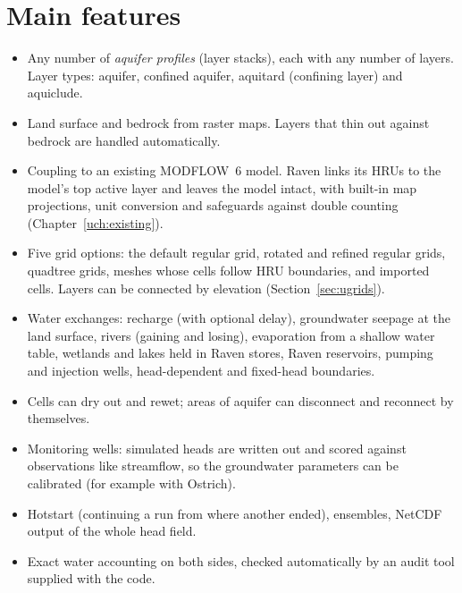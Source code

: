 \section{Main features}
\begin{itemize}
\item Any number of \emph{aquifer profiles} (layer stacks), each with any number of layers. Layer types: aquifer,
confined aquifer, aquitard (confining layer) and aquiclude.
\item Land surface and bedrock from raster maps. Layers that thin out against bedrock are handled automatically.
\item Coupling to an existing MODFLOW~6 model. Raven links its HRUs to the model's top active layer and leaves the model
intact, with built-in map projections, unit conversion and safeguards against double counting
(Chapter~\ref{uch:existing}).
\item Five grid options: the default regular grid, rotated and refined regular grids, quadtree grids, meshes whose cells
follow HRU boundaries, and imported cells. Layers can be connected by elevation (Section~\ref{sec:ugrids}).
\item Water exchanges: recharge (with optional delay), groundwater seepage at the land surface, rivers (gaining and
losing), evaporation from a shallow water table, wetlands and lakes held in Raven stores, Raven reservoirs, pumping and
injection wells, head-dependent and fixed-head boundaries.
\item Cells can dry out and rewet; areas of aquifer can disconnect and reconnect by themselves.
\item Monitoring wells: simulated heads are written out and scored against observations like streamflow, so the
groundwater parameters can be calibrated (for example with Ostrich).
\item Hotstart (continuing a run from where another ended), ensembles, NetCDF output of the whole head field.
\item Exact water accounting on both sides, checked automatically by an audit tool supplied with the code.
\end{itemize}

